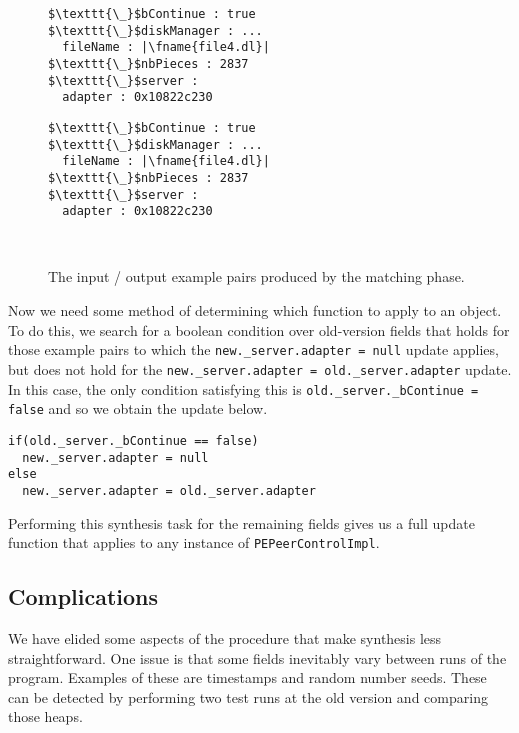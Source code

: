 \begin{figure}
\begin{minipage}{\textwidth / 2}
\begin{lstlisting}
$\texttt{\_}$bContinue : true
$\texttt{\_}$diskManager : ...
  fileName : |\fname{file4.dl}|
$\texttt{\_}$nbPieces : 2837
$\texttt{\_}$server :
  adapter : 0x10822c230
\end{lstlisting}
\end{minipage}
\begin{minipage}{\textwidth / 2}
\begin{lstlisting}
$\texttt{\_}$bContinue : true
$\texttt{\_}$diskManager : ...
  fileName : |\fname{file4.dl}|
$\texttt{\_}$nbPieces : 2837
$\texttt{\_}$server :
  adapter : 0x10822c230
\end{lstlisting}
\end{minipage}
\begin{minipage}{\textwidth / 2}
\ \ \ 
\end{minipage}
\caption{\label{fig:example-pairs}The input / output example pairs produced by the matching phase.}
\end{figure}

Now we need some method of determining which function to apply to an
object.  To do this, we search for a boolean condition over
old-version fields that holds for those example pairs to which the
\texttt{new.\_server.adapter = null} update applies, but does not hold
for the \texttt{new.\_server.adapter = old.\_server.adapter} update.
In this case, the only condition satisfying this is
\texttt{old.\_server.\_bContinue = false} and so we obtain the update
below.
\begin{verbatim}
if(old._server._bContinue == false)
  new._server.adapter = null
else
  new._server.adapter = old._server.adapter
\end{verbatim}

Performing this synthesis task for the remaining fields gives us a
full update function that applies to any instance of
\texttt{PEPeerControlImpl}.

\subsection{Complications}

We have elided some aspects of the procedure that make synthesis less
straightforward.  One issue is that some fields inevitably vary
between runs of the program.  Examples of these are timestamps and
random number seeds.  These can be detected by performing two test
runs at the old version and comparing those heaps.

